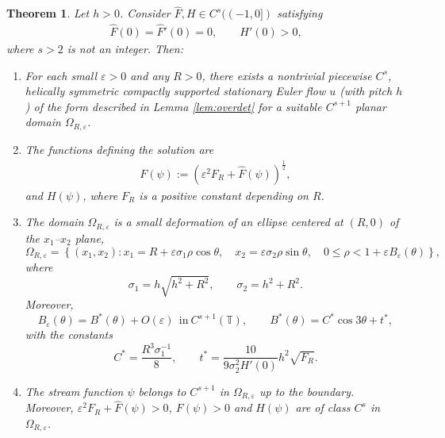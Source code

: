 \documentclass[12pt,reqno]{amsart}
\numberwithin{equation}{section}
\newtheorem{theorem}{Theorem}[section]
\theoremstyle{definition}
\theoremstyle{remark}
\begin{document}
\begin{theorem}\label{thm:main}
	Let $h>0$. 
	Consider $\widehat{F},H\in C^s((-1,0])$ satisfying
	\begin{align*}
	\widehat{F}(0)=  \widehat{F}'(0)=0,
	\qquad H'(0)>0,
	\end{align*}
	where $s>2$ is not an integer. Then:
	\begin{enumerate}%
		\item For each small $\varepsilon>0$ and any $R>0$, there exists a nontrivial piecewise $ C^s $, helically symmetric compactly supported stationary Euler flow $u$ (with pitch $ h $) of the form described in Lemma \ref{lem:overdet} for  a suitable $ C^{s+1} $  planar domain $\varOmega_{R,\varepsilon}$.
		\item The functions defining the solution are
		\begin{align}\label{eq:main-F}
		F(\psi):= \left( \varepsilon^2F_R+  \widehat{F}(\psi)\right) ^{\frac{1}{2}} , 
		\end{align}
		and  $ H(\psi) $,	where $F_R $ is a positive constant depending on $R$.
		\item %
		The domain $\varOmega_{R,\varepsilon}$ is a small deformation of an ellipse centered   at $(R,0)$ of  the $x_1$--$x_2$ plane,
		\begin{equation*} 
		\varOmega_{R,\varepsilon}
		=\left\{(x_1,x_2):
		x_1=R+\varepsilon\sigma_1\rho\cos\theta,
		\quad x_2=\varepsilon\sigma_2\rho\sin\theta,
		\quad 0\le \rho<1+\varepsilon B_\varepsilon(\theta)
		\right\},
		\end{equation*}
		where
		\begin{equation*} 
		\sigma_1=h\sqrt{h^2+R^2},
		\qquad \sigma_2=h^2+R^2.
		\end{equation*}
		Moreover,
		\begin{equation*} 
		B_\varepsilon(\theta)=B^*(\theta)+O(\varepsilon) \  \ \text{in}\ C^{s+1}(\mathbb{T}),
		\qquad
		B^*(\theta)=C^*\cos 3\theta+t^*,
		\end{equation*}
with the constants 
		\begin{equation*} 
		C^*=\frac{R^3\sigma_1^{-1}}{8},
		\qquad
		t^*=\frac{10}{9\sigma_2^2H'(0)}h^2\sqrt{F_R}.
		\end{equation*}
		\item The stream function $\psi$ belongs to $C^{s+1}$ in $\varOmega_{R,\varepsilon}$ up to the boundary. Moreover, $\varepsilon^2F_R+\widehat F(\psi)>0$,   $F (\psi) > 0$ and $H  (\psi)$ are of class $C^s$ in $\varOmega_{R,\varepsilon}$.
	\end{enumerate}
		
\end{theorem}
\end{document}
